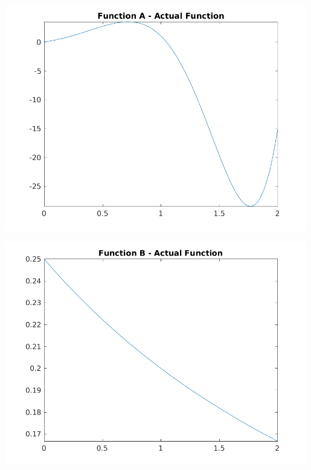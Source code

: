 \documentclass[a4paper]{article}
\begin{document}
\begin{center}
    \centering
    \begin{minipage}{0.5\textwidth}
        \centering
        \includegraphics[width=0.99\textwidth]{../output/a_actual.png}
    \end{minipage}\hfill
    \begin{minipage}{0.5\textwidth}
        \centering
        \includegraphics[width=0.99\textwidth]{../output/b_actual.png}
    \end{minipage}
	\label{fig:true}

\end{center}
\end{document}
